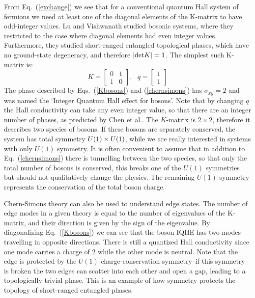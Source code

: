 From Eq.~(\ref{exchange}) we see that for a conventional quantum Hall system of fermions we need at least one of the diagonal elements of the K-matrix to have odd-integer values. Lu and Vishwanath studied bosonic systems, where they restricted to the case where diagonal elements had even integer values. Furthermore, they studied short-ranged entangled topological phases, which have no ground-state degeneracy, and therefore $|{\rm det}K|=1$. The simplest such K-matrix is:
\begin{equation}
K=\left[\begin{array}{cc} 0 & 1 \\ 1 & 0\end{array}\right],~~~q=\left[\begin{array}{cc} 1\\ 1 \end{array}\right]
\label{Kbosons}
\end{equation}
The phase described by Eqs.~(\ref{Kbosons}) and (\ref{chernsimons}) has $\sigma_{xy}=2$ and was named the `Integer Quantum Hall effect for bosons'. Note that by changing $q$ the Hall conductivity can take any even integer value, so that there are an integer number of phases, as predicted by Chen et al.\cite{WenScience,WenPRB}. The $K$-matrix is $2\times2$, therefore it describes two species of bosons. If these bosons are separately conserved, the system has total symmetry $U(1)\times U(1)$, while we are really interested in systems with only $U(1)$ symmetry. It is often convenient to 
assume that in addition to Eq.~(\ref{chernsimons}) there is tunnelling between the two species, so that only the total number of bosons is conserved, this breaks one of the $U(1)$ symmetries but should not qualitatively change the physics. The remaining $U(1)$ symmetry represents the conservation of the total boson charge.

Chern-Simons theory can also be used to understand edge states\cite{Wen_book}. The number of edge modes in a given theory is equal to the number of eigenvalues of the K-matrix, and their direction is given by the sign of the eigenvalue. By diagonalizing Eq.~(\ref{Kbosons}) we can see that the boson IQHE has two modes travelling in opposite directions. There is still a quantized Hall conductivity since one mode carries a charge of $2$ while the other mode is neutral. Note that the edge is protected by the $U(1)$ charge-conservation symmetry--if this symmetry is broken the two edges can scatter into each other and open a gap, leading to a topologically trivial phase. This is an example of how symmetry protects the topology of short-ranged entangled phases.


